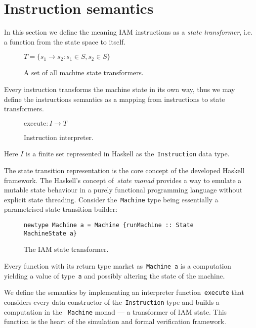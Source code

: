\section{Instruction semantics}
\label{sec:Semantics}

In this section we define the meaning IAM instructions as a \emph{state
transformer}, i.e. a function from the state space to itself.

\begin{figure}[H]
\centering
$T = \{s_1 \rightarrow s_2 : s_1 \in S, s_2 \in S\}$
\label{}
\caption{A set of all machine state transformers.}
\end{figure}

Every instruction transforms the machine state in its own
way, thus we may define the instructions semantics as a mapping from instructions
to state transformers.

\begin{figure}[H]
\centering
$ \textrm{execute}:I \rightarrow T$
\label{}
\caption{Instruction interpreter.}
\end{figure}

Here $I$ is a finite set represented in Haskell as
the~\texttt{Instruction} data type.

The state transition representation is the core concept of the developed
Haskell framework. The Haskell's concept of~\emph{state monad} provides a way to
emulate a mutable state behaviour in a purely functional programming language
without explicit state threading. Consider the~\texttt{Machine} type being
essentially a parametrised state-transition builder:

\begin{figure}[H]
\begin{verbatim}
newtype Machine a = Machine {runMachine :: State MachineState a}
\end{verbatim}
\caption{The IAM state transformer.}
\end{figure}

Every function with its return type market as~\texttt{Machine a} is a computation
yielding a value of type~\texttt{a} and possibly altering the state of the machine.

We define the semantics by implementing an interpreter
function~\texttt{execute} that considers every data constructor of
the~\texttt{Instruction} type and builds a computation in the
~\texttt{Machine} monad --- a transformer of IAM state. This function
is the heart of the simulation and formal verification framework.

